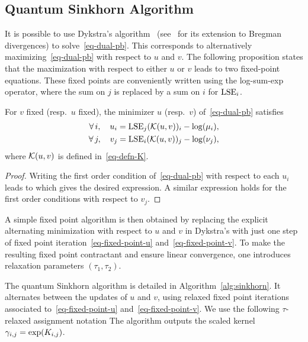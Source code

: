 \subsection{Quantum Sinkhorn Algorithm}

It is possible to use Dykstra's algorithm~ (see~\cite{bauschke-lewis} for its extension to Bregman divergences) to solve~\eqref{eq-dual-pb}. This corresponds to alternatively maximizing~\eqref{eq-dual-pb} with respect to $u$ and $v$. 
%
The following proposition states that the maximization with respect to either $u$ or $v$ leads to two fixed-point equations. 
%
These fixed points are conveniently written using the log-sum-exp operator, 
where the sum on $j$ is replaced by a sum on $i$ for $\operatorname{LSE}_i$. 

\begin{prop}\label{prop-fixed-points}
	For $v$ fixed (resp.\ $u$ fixed), the minimizer $u$ (resp.\ $v$) of~\eqref{eq-dual-pb} satisfies
	\begin{align}\label{eq-fixed-point-u}
		\forall \, i, \quad u_i = \operatorname{LSE}_j(\mathcal{K}(u,v))_i-\log(\mu_i), \\
		\forall \, j, \quad v_j = \operatorname{LSE}_i(\mathcal{K}(u,v))_j-\log(\nu_j), \label{eq-fixed-point-v}
	\end{align}
	where $\mathcal{K}(u,v)$ is defined in~\eqref{eq-defn-K}.
\end{prop}
\begin{proof}
	Writing the first order condition of~\eqref{eq-dual-pb} with respect to each $u_i$ leads to
	which gives the desired expression. A similar expression holds for the first order conditions with respect to $v_j$.
\end{proof}

A simple fixed point algorithm is then obtained by replacing the explicit alternating minimization with respect to $u$ and $v$ in Dykstra's with just one step of fixed point iteration~\eqref{eq-fixed-point-u} and~\eqref{eq-fixed-point-v}. To make the resulting fixed point contractant and ensure linear convergence, one introduces relaxation parameters $(\tau_1,\tau_2)$. 

The quantum Sinkhorn algorithm is detailed in Algorithm~\ref{alg:sinkhorn}. It alternates between the updates of $u$ and $v$, using relaxed fixed point iterations associated to~\eqref{eq-fixed-point-u} and~\eqref{eq-fixed-point-v}. We use the following $\tau$-relaxed assignment notation 
The algorithm outputs the scaled kernel $\gamma_{i,j} = \exp(K_{i,j})$.


